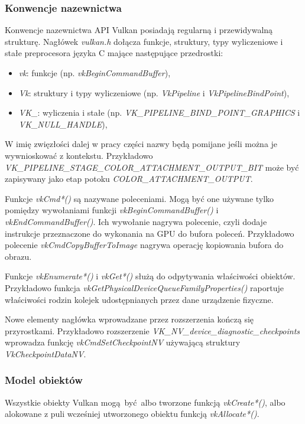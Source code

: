 \subsubsection{Konwencje nazewnictwa}
Konwencje nazewnictwa API Vulkan posiadają regularną i przewidywalną strukturę.
Nagłówek \textit{vulkan.h} dołącza funkcje, struktury, typy wyliczeniowe i stałe preprocesora języka C mające następujące przedrostki:
\begin{itemize}
	\item \textit{vk}: funkcje (np. \textit{vkBeginCommandBuffer}),
	\item \textit{Vk}: struktury i typy wyliczeniowe (np. \textit{VkPipeline} i  \textit{VkPipelineBindPoint}),
	\item \textit{VK\_}: wyliczenia i stałe (np. \textit{VK\_PIPELINE\_BIND\_POINT\_GRAPHICS} i \textit{VK\_NULL\_HANDLE}),
\end{itemize}
W imię zwięzłości dalej w pracy części nazwy będą pomijane jeśli można je wywnioskować z kontekstu. Przykładowo \textit{VK\_PIPELINE\_STAGE\_COLOR\_ATTACHMENT\_OUTPUT\_BIT} może być zapisywany jako etap potoku \textit{COLOR\_ATTACHMENT\_OUTPUT}.

Funkcje \textit{vkCmd*()} są nazywane poleceniami.
Mogą być one używane tylko pomiędzy wywołaniami funkcji \textit{vkBeginCommandBuffer()} i \textit{vkEndCommandBuffer()}. Ich wywołanie nagrywa polecenie, czyli dodaje instrukcje przeznaczone do wykonania na GPU do bufora poleceń.
Przykładowo polecenie \textit{vkCmdCopyBufferToImage} nagrywa operację kopiowania bufora do obrazu.

Funkcje \textit{vkEnumerate*()} i \textit{vkGet*()} służą do odpytywania właściwości obiektów. Przykładowo funkcja \textit{vkGetPhysicalDeviceQueueFamilyProperties()} raportuje właściwości rodzin kolejek udostępnianych przez dane urządzenie fizyczne.

Nowe elementy nagłówka wprowadzane przez rozszerzenia kończą się przyrostkami. Przykładowo rozszerzenie \textit{VK\_NV\_device\_diagnostic\_checkpoints} wprowadza funkcję \textit{vkCmdSetCheckpointNV} używającą struktury \textit{VkCheckpointDataNV}.

\subsubsection{Model obiektów}

Wszystkie obiekty Vulkan mogą być albo tworzone funkcją \textit{vkCreate*()}, albo alokowane z puli wcześniej utworzonego obiektu funkcją \textit{vkAllocate*()}.

